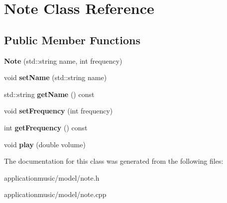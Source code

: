 \hypertarget{class_note}{\section{Note Class Reference}
\label{class_note}
}
\subsection*{Public Member Functions}
\begin{DoxyCompactItemize}
\item 
\hypertarget{class_note_ad7dcafc723e68569639bd58bba6da623}{{\bfseries Note} (std\-::string name, int frequency)}\label{class_note_ad7dcafc723e68569639bd58bba6da623}

\item 
\hypertarget{class_note_acfef52222dab8bb2e15610643aa6c2ec}{void {\bfseries set\-Name} (std\-::string name)}\label{class_note_acfef52222dab8bb2e15610643aa6c2ec}

\item 
\hypertarget{class_note_a6be428300ec726fcab134b0d0e388401}{std\-::string {\bfseries get\-Name} () const }\label{class_note_a6be428300ec726fcab134b0d0e388401}

\item 
\hypertarget{class_note_abe02bd4d9f5a40e0f1222dd4e3c89875}{void {\bfseries set\-Frequency} (int frequency)}\label{class_note_abe02bd4d9f5a40e0f1222dd4e3c89875}

\item 
\hypertarget{class_note_a07d9c28685d79137e8a4073a0247dae5}{int {\bfseries get\-Frequency} () const }\label{class_note_a07d9c28685d79137e8a4073a0247dae5}

\item 
\hypertarget{class_note_a2eb9c1687f4849e78119d51d5966bf78}{void {\bfseries play} (double volume)}\label{class_note_a2eb9c1687f4849e78119d51d5966bf78}

\end{DoxyCompactItemize}


The documentation for this class was generated from the following files\-:\begin{DoxyCompactItemize}
\item 
applicationmusic/model/note.\-h\item 
applicationmusic/model/note.\-cpp\end{DoxyCompactItemize}
